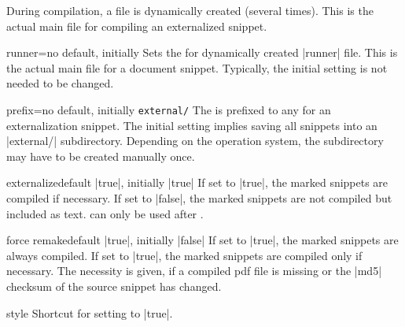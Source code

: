 During compilation, a  file
is dynamically created (several times). This is the actual main file for
compiling an externalized snippet.

\begin{extTcbKey}[][doc new=2015-03-11]{runner}{=}{no default,
  initially \texttt{}}
Sets the  for dynamically created |runner| file.
This is the actual main file for a document snippet.
Typically, the initial setting is not needed to be changed.
\begin{dispListing}
\end{dispListing}
\end{extTcbKey}

\begin{extTcbKey}[][doc new=2015-03-11]{prefix}{=}{no default,
  initially \texttt{external/}}
The  is prefixed to any  for an
externalization snippet. The initial setting implies saving all snippets
into an |external/| subdirectory. Depending on the operation system,
the subdirectory may have to be created manually once.
\begin{dispListing}
\end{dispListing}
\end{extTcbKey}


\begin{extTcbKey}[][doc new=2015-03-11]{externalize}{}{default |true|,
  initially |true|}
If set to |true|, the marked snippets are compiled if necessary.
If set to |false|, the marked snippets are not compiled but included as text.
 can only be used after .
\end{extTcbKey}

\begin{extTcbKey}[][doc new=2015-03-11]{force remake}{}{default |true|,
  initially |false|}
If set to |true|, the marked snippets are always compiled.
If set to |true|, the marked snippets are compiled only if necessary.
The necessity is given, if a compiled pdf file is missing or the
|md5| checksum of the source snippet has changed.
\end{extTcbKey}

\enlargethispage*{1cm}
\begin{extTcbKey}[][doc new=2015-03-11]{\tcbexclamation}{}{style}
  Shortcut for setting  to |true|.
\end{extTcbKey}


